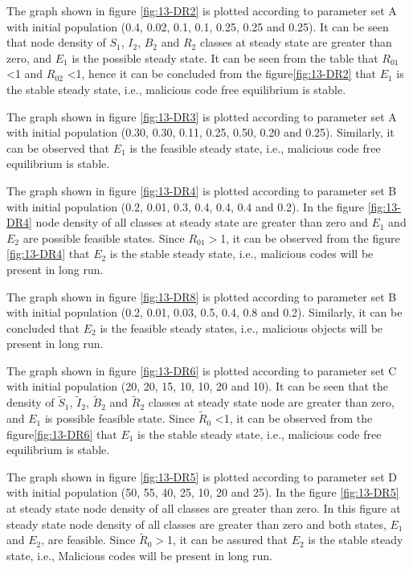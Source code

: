 The graph shown in figure \ref{fig:13-DR2} is plotted according to parameter set A with initial population (0.4, 0.02, 0.1, 0.1, 0.25, 0.25 and 0.25).
It can be seen that node density of $S_1$, $I_2$, $B_2$ and $R_2$ classes at steady state are greater than zero, and $E_1$ is the possible steady state.
It can be seen from the table that $R_{01}$ \textless 1 and $R_{02}$ \textless 1, hence it can be concluded from the figure\ref{fig:13-DR2}
that $E_1$ is the stable steady state, i.e., malicious code free equilibrium is stable.
\par The graph shown in figure \ref{fig:13-DR3} is plotted according to parameter set A with initial population (0.30, 0.30, 0.11, 0.25, 0.50, 0.20 and 0.25).
Similarly, it can be observed that $E_1$ is the feasible steady state, i.e., malicious code free equilibrium is stable.
\par The graph shown in figure \ref{fig:13-DR4} is plotted according to parameter set B with initial population (0.2, 0.01, 0.3, 0.4, 0.4, 0.4 and  0.2).
In the figure \ref{fig:13-DR4} node density of all classes at steady state are greater than zero and $E_1$ and $E_2$ are possible feasible states.
Since $R_{01}$$>$1, it can be observed from the figure \ref{fig:13-DR4} that $E_2$ is the stable steady state, i.e., malicious codes will be present in long run.
\par The graph shown in figure \ref{fig:13-DR8} is plotted according to parameter set B with initial population (0.2, 0.01, 0.03, 0.5, 0.4, 0.8 and 0.2).
Similarly, it can be concluded that $E_2$ is the feasible steady states, i.e., malicious objects will be present in long run.
\par The graph shown in figure \ref{fig:13-DR6} is plotted according to parameter set C with initial population (20, 20, 15, 10, 10, 20 and 10).
It can be seen that the density of $\tilde S_1$, $\tilde I_2$, $\tilde B_2$ and $\tilde R_2$
classes at steady state node are greater than zero, and $E_1$ is possible feasible state. Since $\tilde R_0$ \textless 1, it can be observed from the figure\ref{fig:13-DR6}
that $E_1$ is the stable steady state, i.e., malicious code free equilibrium is stable.
\par The graph shown in figure \ref{fig:13-DR5} is plotted according to parameter set D with initial population (50, 55, 40, 25, 10, 20 and 25).
In the figure \ref{fig:13-DR5} at steady state node density of all classes are greater than zero.
In this figure at steady state node density of all classes are greater than zero and both states, $E_1$ and $E_2$, are feasible.
Since $\tilde R_0$$>$1, it can be assured that $E_2$ is the stable steady state, i.e., Malicious codes will be present in long run.
